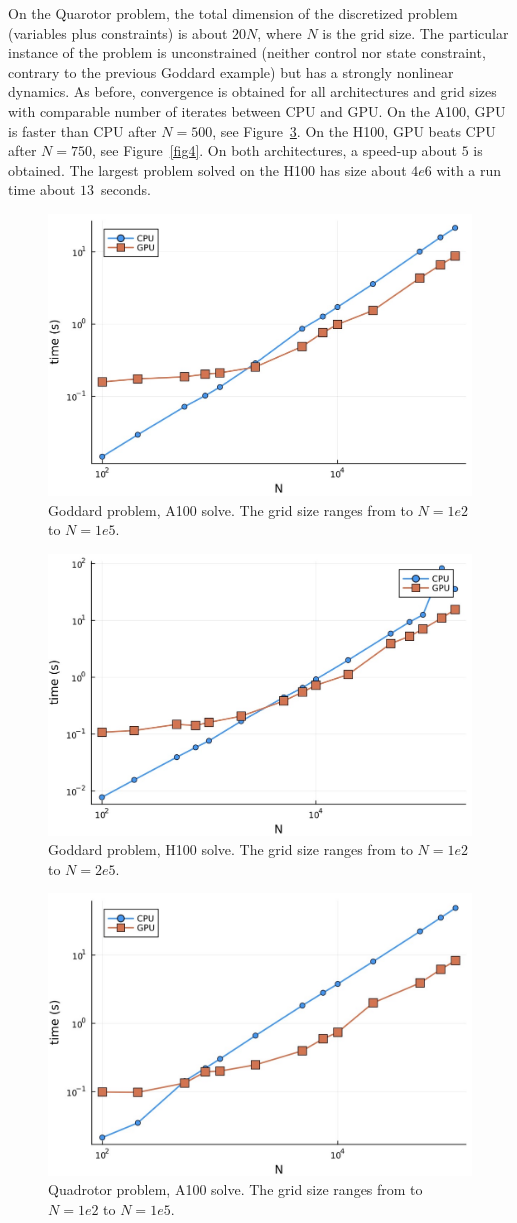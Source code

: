 On the Quarotor problem, the total dimension of the discretized problem (variables plus constraints) is about $20 N$, where $N$ is the grid size.
The particular instance of the problem is unconstrained (neither control nor state
constraint, contrary to the previous Goddard example) but has a strongly nonlinear dynamics. 
As before, convergence is obtained for all architectures and grid sizes
with comparable number of iterates between CPU and GPU.
On the A100, GPU is faster than CPU after $N = 500$, see Figure~\ref{fig2}.
On the H100, GPU beats CPU after $N = 750$, see Figure~\ref{fig4}.
On both architectures, a speed-up about $5$ is obtained.
The largest problem solved on the H100 has size about $4e6$ with a run time about $13$~seconds.

\begin{figure}
\includegraphics[width=.45\textwidth]{goddard-a100.jpg}
\caption{Goddard problem, A100 solve. The grid size ranges from to $N = 1e2$ to $N = 1e5$.}
\label{fig1}
\end{figure}

 \begin{figure}
\includegraphics[width=.45\textwidth]{goddard-h100.jpg}
\caption{Goddard problem, H100 solve. The grid size ranges from to $N = 1e2$ to $N = 2e5$.}
\label{fig3}
\end{figure}
 
\begin{figure}
\includegraphics[width=.45\textwidth]{quadrotor-a100.jpg}
\caption{Quadrotor problem, A100 solve. The grid size ranges from to $N = 1e2$ to $N = 1e5$.}
\label{fig2}
\end{figure}

